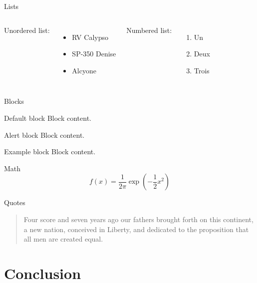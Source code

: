 \documentclass{beamer}
\begin{document}
\begin{frame}{Lists}
  \begin{columns}
    Unordered list:
    \begin{itemize}
    \item RV Calypso
    \item SP-350 Denise
    \item Alcyone
    \end{itemize}

    Numbered list:
    \begin{enumerate}
    \item Un
    \item Deux
    \item Trois
    \end{enumerate}
  \end{columns}
  
\end{frame}

\begin{frame}{Blocks}

  \begin{block}{Default block}
    Block content.
  \end{block}

  \begin{alertblock}{Alert block}
    Block content.
  \end{alertblock}

  \begin{exampleblock}{Example block}  
    Block content.
  \end{exampleblock}

\end{frame}

\begin{frame}{Math}
  \[f(x) = \frac{1}{2\pi}\exp\left( -\frac{1}{2}x^2 \right)\]
\end{frame}

\begin{frame}{Quotes}
  \begin{quote}
    Four score and seven years ago our fathers brought forth on this continent, a new nation, conceived in Liberty, and dedicated to the proposition that all men are created equal.
  \end{quote}
\end{frame}

\section{Conclusion}
\end{document}
